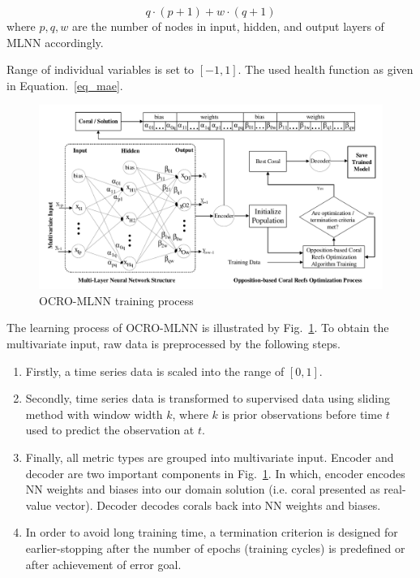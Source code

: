 \documentclass[smallcondensed, natbib]{svjour3}     %
\begin{document}
\begin{equation}
	q \cdot (p + 1) + w \cdot (q + 1) 
\end{equation}
where $p, q, w$ are the number of nodes in input, hidden, and output layers of MLNN accordingly. 

Range of individual variables is set to $[-1, 1]$. The used health function as given in Equation.~\ref{eq_mae}.

\begin{figure}
	\begin{center}
		\includegraphics[width=1.0\textwidth =0cm 0cm 0cm 0cm, clip]{images/pdf/system/cro_training_final.pdf}
		\caption{OCRO-MLNN training process}
		\label{fig_ocro_training}
	\end{center}
\end{figure}

The learning process of OCRO-MLNN is illustrated by Fig.~\ref{fig_ocro_training}. To obtain the multivariate input, raw data is preprocessed by the following steps.

\begin{enumerate}
	\item Firstly, a time series data is scaled into the range of $[0, 1]$. 
	\item Secondly, time series data is transformed to supervised data using sliding method with window width $k$, where $k$ is prior observations before time $t$ used to predict the observation at $t$. 
	\item Finally, all metric types are grouped into multivariate input. Encoder and decoder are two important components in Fig.~\ref{fig_ocro_training}. In which, encoder encodes NN weights and biases into our domain solution (i.e. coral presented as real-value vector). Decoder decodes corals back into NN weights and biases. 
	\item In order to avoid long training time, a termination criterion is designed for earlier-stopping after the number of epochs (training cycles) is predefined or after achievement of error goal. 
\end{enumerate}
\end{document}
